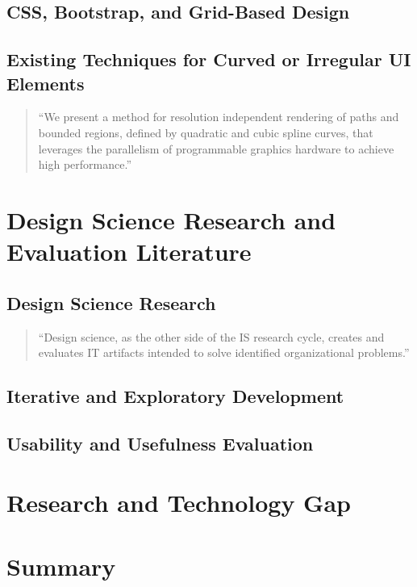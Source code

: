 \subsection{CSS, Bootstrap, and Grid-Based Design}

\subsection{Existing Techniques for Curved or Irregular UI Elements}
\begin{quote}
``We present a method for resolution independent rendering of paths and bounded regions, defined by quadratic and cubic spline curves, that leverages the parallelism of programmable graphics hardware to achieve high performance.''
\end{quote}
\citep{loop_resolution_2005}

\section{Design Science Research and Evaluation Literature}
\subsection{Design Science Research}
\begin{quote}
``Design science, as the other side of the IS research cycle, creates and evaluates IT artifacts intended to solve identified organizational problems.''
\end{quote}
\citep{hevner_design_2004}

\subsection{Iterative and Exploratory Development}

\subsection{Usability and Usefulness Evaluation}

\section{Research and Technology Gap}

\section{Summary}
